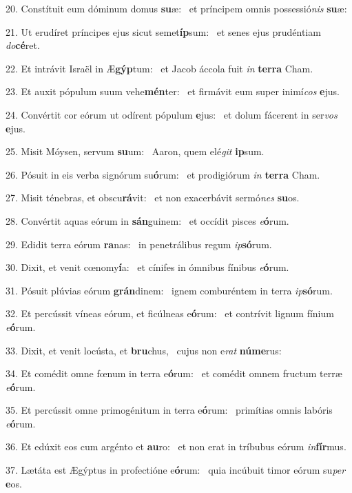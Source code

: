 20. Constítuit eum dóminum domus \textbf{su}æ: \ast\  et príncipem omnis possessió\textit{nis} \textbf{su}æ:\

21. Ut erudíret príncipes ejus sicut semet\textbf{íp}sum: \ast\  et senes ejus prudéntiam \textit{do}\textbf{cé}ret.\

22. Et intrávit Israël in Æ\textbf{gýp}tum: \ast\  et Jacob áccola fuit \textit{in} \textbf{ter}\textbf{ra} Cham.\

23. Et auxit pópulum suum vehe\textbf{mén}ter: \ast\  et firmávit eum super inimí\textit{cos} \textbf{e}jus.\

24. Convértit cor eórum ut odírent pópulum \textbf{e}jus: \ast\  et dolum fácerent in ser\textit{vos} \textbf{e}jus.\

25. Misit Móysen, servum \textbf{su}um: \ast\  Aaron, quem elé\textit{git} \textbf{ip}sum.\

26. Pósuit in eis verba signórum su\textbf{ó}rum: \ast\  et prodigiórum \textit{in} \textbf{ter}\textbf{ra} Cham.\

27. Misit ténebras, et obscu\textbf{rá}vit: \ast\  et non exacerbávit sermó\textit{nes} \textbf{su}os.\

28. Convértit aquas eórum in \textbf{sán}guinem: \ast\  et occídit pisces \textit{e}\textbf{ó}rum.\

29. Edidit terra eórum \textbf{ra}nas: \ast\  in penetrálibus regum \textit{ip}\textbf{só}rum.\

30. Dixit, et venit cœnomy\textbf{í}a: \ast\  et cínifes in ómnibus fínibus \textit{e}\textbf{ó}rum.\

31. Pósuit plúvias eórum \textbf{grán}dinem: \ast\  ignem comburéntem in terra \textit{ip}\textbf{só}rum.\

32. Et percússit víneas eórum, et ficúlneas e\textbf{ó}rum: \ast\  et contrívit lignum fínium \textit{e}\textbf{ó}rum.\

33. Dixit, et venit locústa, et \textbf{bru}chus, \ast\  cujus non e\textit{rat} \textbf{nú}\textbf{me}rus:\

34. Et comédit omne fœnum in terra e\textbf{ó}rum: \ast\  et comédit omnem fructum terræ \textit{e}\textbf{ó}rum.\

35. Et percússit omne primogénitum in terra e\textbf{ó}rum: \ast\  primítias omnis labóris \textit{e}\textbf{ó}rum.\

36. Et edúxit eos cum argénto et \textbf{au}ro: \ast\  et non erat in tríbubus eórum \textit{in}\textbf{fír}mus.\

37. Lætáta est Ægýptus in profectióne e\textbf{ó}rum: \ast\  quia incúbuit timor eórum su\textit{per} \textbf{e}os.\

